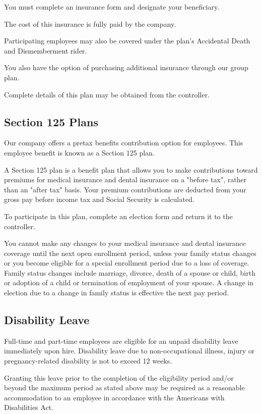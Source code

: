 \documentclass{book}
\begin{document}
You must complete an insurance form and designate your beneficiary.

The cost of this insurance is fully paid by the company.

Participating employees may also be covered under the plan's Accidental Death and Dismemberment rider.

You also have the option of purchasing additional insurance through our group plan.

Complete details of this plan may be obtained from the controller.

\subsection{Section 125 Plans}

Our company offers a pretax benefits contribution option for employees. This employee benefit is known as a Section 125 plan.

A Section 125 plan is a benefit plan that allows you to make contributions toward premiums for medical insurance and dental insurance on a "before tax", rather than an "after tax" basis. Your premium contributions are deducted from your gross pay before income tax and Social Security is calculated.

To participate in this plan, complete an election form and return it to the controller.

You cannot make any changes to your medical insurance and dental insurance coverage until the next open enrollment period, unless your family status changes or you become eligible for a special enrollment period due to a loss of coverage. Family status changes include marriage, divorce, death of a spouse or child, birth or adoption of a child or termination of employment of your spouse. A change in election due to a change in family status is effective the next pay period.

\subsection{Disability Leave}

Full-time and part-time employees are eligible for an unpaid disability leave immediately upon hire. Disability leave due to non-occupational illness, injury or pregnancy-related disability is not to exceed 12 weeks.

Granting this leave prior to the completion of the eligibility period and/or beyond the maximum period as stated above may be required as a reasonable accommodation to an employee in accordance with the Americans with Disabilities Act.
\end{document}
